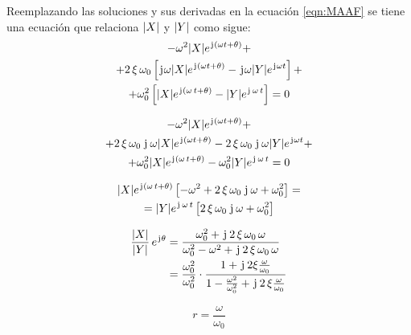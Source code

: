 Reemplazando las soluciones y sus derivadas en la ecuación \ref{eqn:MAAF} se tiene una ecuación que relaciona ${\left| {X} \right|}$ y ${\left| {Y} \right|}$ como sigue:
\begin{multline*}
    -\omega^2 {\left| {X} \right|} e^{\mkern2mu\mathrm{j}\mkern1mu (\omega t + \theta)} +
    \\
    + 2 \, \xi \, \omega_0 \left[ \mkern2mu\mathrm{j}\mkern1mu \omega {\left| {X} \right|} e^{\mkern2mu\mathrm{j}\mkern1mu (\omega t + \theta)} - \mkern2mu\mathrm{j}\mkern1mu \omega {\left| {Y} \right|} e^{\mkern2mu\mathrm{j}\mkern1mu \omega t} \right] +
    \\
    + \omega_0^2 \left[ {\left| {X} \right|} e^{\mkern2mu\mathrm{j}\mkern1mu (\omega \, t + \theta)} - {\left| {Y} \right|} e^{\mkern2mu\mathrm{j}\mkern1mu \, \omega \, t} \right] = 0
\end{multline*}

\begin{multline*}
    -\omega^2 {\left| {X} \right|} e^{\mkern2mu\mathrm{j}\mkern1mu (\omega t + \theta)} +
    \\
    + 2 \, \xi \, \omega_0 \, \mkern2mu\mathrm{j}\mkern1mu \, \omega {\left| {X} \right|} e^{\mkern2mu\mathrm{j}\mkern1mu (\omega t + \theta)} - 2 \, \xi \, \omega_0 \, \mkern2mu\mathrm{j}\mkern1mu \, \omega {\left| {Y} \right|} e^{\mkern2mu\mathrm{j}\mkern1mu \omega t} +
    \\
    + \omega_0^2 {\left| {X} \right|} e^{\mkern2mu\mathrm{j}\mkern1mu (\omega \, t + \theta)} - \omega_0^2 {\left| {Y} \right|} e^{\mkern2mu\mathrm{j}\mkern1mu \, \omega \, t} = 0
\end{multline*}

\begin{multline*}
    {\left| {X} \right|} e^{\mkern2mu\mathrm{j}\mkern1mu (\omega \, t + \theta)} \left[ -\omega^2 + 2 \, \xi \, \omega_0 \, \mkern2mu\mathrm{j}\mkern1mu \, \omega + \omega_0^2  \right] =
    \\
    = {\left| {Y} \right|} e^{\mkern2mu\mathrm{j}\mkern1mu \, \omega \, t} \left[ 2 \, \xi \, \omega_0 \, \mkern2mu\mathrm{j}\mkern1mu \, \omega + \omega_0^2 \right]
\end{multline*}

\begin{align*}
    \frac{{\left| {X} \right|}}{{\left| {Y} \right|}} \, e^{\mkern2mu\mathrm{j}\mkern1mu\theta}
    &= \frac{\omega_0^2 + \mkern2mu\mathrm{j}\mkern1mu \, 2 \, \xi \, \omega_0 \, \omega}{\omega_0^2 - \omega^2 + \mkern2mu\mathrm{j}\mkern1mu \, 2 \, \xi \, \omega_0 \, \omega}
    \\
    &= \frac{\omega_0^2}{\omega_0^2} \cdot \frac{1+ \mkern2mu\mathrm{j}\mkern1mu \, 2 \xi \frac{\omega}{\omega_0}}{1-\frac{\omega^2}{\omega_0^2} + \mkern2mu\mathrm{j}\mkern1mu \, 2 \, \xi \frac{\omega}{\omega_0}}
\end{align*}

\begin{mdframed}[style=DefinitionFrame]
    \begin{defn}
    \end{defn}
    \begin{equation*}
        r=\frac{\omega}{\omega_0}
    \end{equation*}
\end{mdframed}


